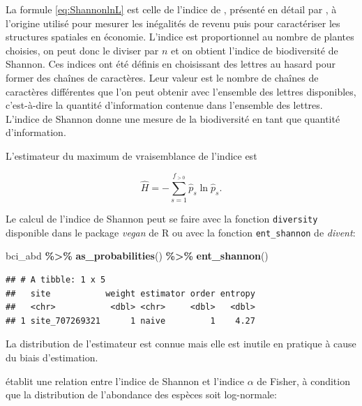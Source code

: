 \documentclass[
  11pt,
  american,
  a4paper,
  extrafontsizes,onecolumn,openright
  ]{memoir}
\newenvironment{Shaded}{\begin{snugshade}}{\end{snugshade}}
\newcommand{\FunctionTok}[1]{\textcolor[rgb]{0.13,0.29,0.53}{\textbf{#1}}}
\newcommand{\NormalTok}[1]{#1}
\newcommand{\SpecialCharTok}[1]{\textcolor[rgb]{0.81,0.36,0.00}{\textbf{#1}}}
\begin{document}
La formule \eqref{eq:ShannonlnL} est celle de l'indice de \textcite{Theil1967}, présenté en détail par \textcite{Conceicao2000}, à l'origine utilisé pour mesurer les inégalités de revenu puis pour caractériser les structures spatiales en économie.
L'indice est proportionnel au nombre de plantes choisies, on peut donc le diviser par \(n\) et on obtient l'indice de biodiversité de Shannon.
Ces indices ont été définis en choisissant des lettres au hasard pour former des chaînes de caractères.
Leur valeur est le nombre de chaînes de caractères différentes que l'on peut obtenir avec l'ensemble des lettres disponibles, c'est-à-dire la quantité d'information contenue dans l'ensemble des lettres.
L'indice de Shannon donne une mesure de la biodiversité en tant que quantité d'information.

L'estimateur du maximum de vraisemblance de l'indice est

\begin{equation}
  \label{eq:EstShannonML}
  \hat{H} = -\sum^{f_{>0}}_{s=1}{\hat{p}_s \ln{\hat{p}_s}}.
\end{equation}

Le calcul de l'indice de Shannon peut se faire avec la fonction \texttt{diversity} disponible dans le package \emph{vegan} de R ou avec la fonction \texttt{ent\_shannon} de \emph{divent}:

\scriptsize

\begin{Shaded}
\begin{Highlighting}[]
\NormalTok{bci\_abd }\SpecialCharTok{\%\textgreater{}\%} 
  \FunctionTok{as\_probabilities}\NormalTok{() }\SpecialCharTok{\%\textgreater{}\%} 
  \FunctionTok{ent\_shannon}\NormalTok{()}
\end{Highlighting}
\end{Shaded}

\begin{verbatim}
## # A tibble: 1 x 5
##   site           weight estimator order entropy
##   <chr>           <dbl> <chr>     <dbl>   <dbl>
## 1 site_707269321      1 naive         1    4.27
\end{verbatim}

\normalsize

La distribution de l'estimateur est connue \autocite{Hutcheson1970} mais elle est inutile en pratique à cause du biais d'estimation.

\textcite{Bulmer1974} établit une relation entre l'indice de Shannon et l'indice \(\alpha\) de Fisher, à condition que la distribution de l'abondance des espèces soit log-normale:
\end{document}
